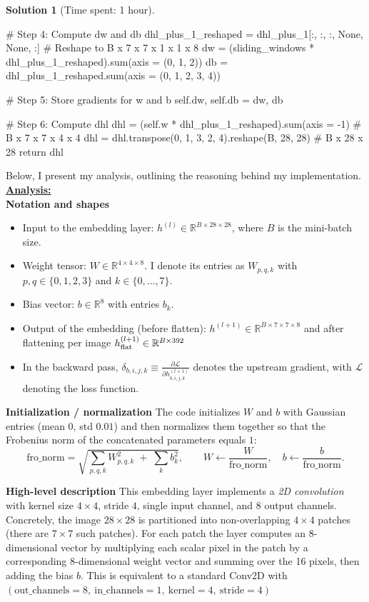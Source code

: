 \documentclass[11pt, reqno, letterpaper, twoside]{amsart}
\theoremstyle{plain}
\theoremstyle{definition}
\newtheorem{solution}[theorem]{Solution}
\begin{document}
\begin{solution}[Time spent: 1 hour]
\begin{enumerate}
\begin{python}
        # Step 4: Compute dw and db
        dhl_plus_1_reshaped = dhl_plus_1[:, :, :, None, None, :] # Reshape to B x 7 x 7 x 1 x 1 x 8
        dw = (sliding_windows * dhl_plus_1_reshaped).sum(axis = (0, 1, 2))
        db = dhl_plus_1_reshaped.sum(axis = (0, 1, 2, 3, 4))

        # Step 5: Store gradients for w and b
        self.dw, self.db = dw, db

        # Step 6: Compute dhl
        dhl = (self.w * dhl_plus_1_reshaped).sum(axis = -1) # B x 7 x 7 x 4 x 4 
        dhl = dhl.transpose(0, 1, 3, 2, 4).reshape(B, 28, 28) # B x 28 x 28
        return dhl
\end{python}
Below, I present my analysis, outlining the reasoning behind my implementation.   \\
\textbf{\underline{Analysis:}} \\
\textbf{Notation and shapes}
\begin{itemize}
  \item Input to the embedding layer: $h^{(l)} \in \mathbb{R}^{B\times 28 \times 28}$, where $B$ is the mini-batch size.
  \item Weight tensor: $W \in \mathbb{R}^{4\times 4 \times 8}$. I denote its entries as $W_{p,q,k}$ with $p,q\in\{0,1,2,3\}$ and $k\in\{0,\dots,7\}$.
  \item Bias vector: $b \in \mathbb{R}^{8}$ with entries $b_k$.
  \item Output of the embedding (before flatten): $h^{(l+1)} \in \mathbb{R}^{B \times 7 \times 7 \times 8}$ and after flattening per image $h^{(l+1)}_{{\rm flat}} \in \mathbb{R}^{B\times 392}$
  \item In the backward pass, $\delta_{b,i,j,k} \equiv \frac{\partial \mathcal{L}}{\partial h^{(l+1)}_{b,i,j,k}}$ denotes the upstream gradient, with $\mathcal{L}$ denoting the loss function. 
\end{itemize}

\noindent \textbf{Initialization / normalization}
The code initializes $W$ and $b$ with Gaussian entries (mean $0$, std $0.01$) and then normalizes them together so that the Frobenius norm of the concatenated parameters equals $1$:
\[
\text{fro\_norm} = \sqrt{\sum_{p,q,k} W_{p,q,k}^2 \;+\; \sum_{k} b_k^2},\qquad
W \leftarrow \frac{W}{\text{fro\_norm}},\quad b \leftarrow \frac{b}{\text{fro\_norm}}.
\]

\noindent \textbf{High-level description}
This embedding layer implements a \emph{2D convolution} with kernel size $4\times 4$, stride $4$, single input channel, and $8$ output channels. Concretely, the image $28\times 28$ is partitioned into non-overlapping $4\times4$ patches (there are $7\times7$ such patches). For each patch the layer computes an $8$-dimensional vector by multiplying each scalar pixel in the patch by a corresponding $8$-dimensional weight vector and summing over the 16 pixels, then adding the bias $b$. This is equivalent to a standard Conv2D with $(\text{out\_channels}=8,\ \text{in\_channels}=1,\ \text{kernel}=4,\ \text{stride}=4)$ \\


\end{enumerate}
\end{solution}
\end{document}

